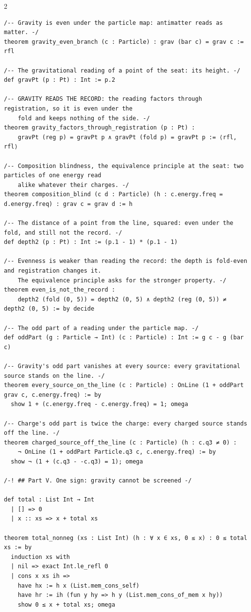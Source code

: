 \documentclass[10pt]{article}
\begin{document}
\begin{multicols}{2}
\begin{Verbatim}[fontsize=\fontsize{5.9}{6.8}\selectfont,breaklines,breakanywhere,breaksymbolleft={}]
/-- Gravity is even under the particle map: antimatter reads as matter. -/
theorem gravity_even_branch (c : Particle) : grav (bar c) = grav c := rfl

/-- The gravitational reading of a point of the seat: its height. -/
def gravPt (p : Pt) : Int := p.2

/-- GRAVITY READS THE RECORD: the reading factors through registration, so it is even under the
    fold and keeps nothing of the side. -/
theorem gravity_factors_through_registration (p : Pt) :
    gravPt (reg p) = gravPt p ∧ gravPt (fold p) = gravPt p := ⟨rfl, rfl⟩

/-- Composition blindness, the equivalence principle at the seat: two particles of one energy read
    alike whatever their charges. -/
theorem composition_blind (c d : Particle) (h : c.energy.freq = d.energy.freq) : grav c = grav d := h

/-- The distance of a point from the line, squared: even under the fold, and still not the record. -/
def depth2 (p : Pt) : Int := (p.1 - 1) * (p.1 - 1)

/-- Evenness is weaker than reading the record: the depth is fold-even and registration changes it.
    The equivalence principle asks for the stronger property. -/
theorem even_is_not_the_record :
    depth2 (fold (0, 5)) = depth2 (0, 5) ∧ depth2 (reg (0, 5)) ≠ depth2 (0, 5) := by decide

/-- The odd part of a reading under the particle map. -/
def oddPart (g : Particle → Int) (c : Particle) : Int := g c - g (bar c)

/-- Gravity's odd part vanishes at every source: every gravitational source stands on the line. -/
theorem every_source_on_the_line (c : Particle) : OnLine (1 + oddPart grav c, c.energy.freq) := by
  show 1 + (c.energy.freq - c.energy.freq) = 1; omega

/-- Charge's odd part is twice the charge: every charged source stands off the line. -/
theorem charged_source_off_the_line (c : Particle) (h : c.q3 ≠ 0) :
    ¬ OnLine (1 + oddPart Particle.q3 c, c.energy.freq) := by
  show ¬ (1 + (c.q3 - -c.q3) = 1); omega

/-! ## Part V. One sign: gravity cannot be screened -/

def total : List Int → Int
  | [] => 0
  | x :: xs => x + total xs

theorem total_nonneg (xs : List Int) (h : ∀ x ∈ xs, 0 ≤ x) : 0 ≤ total xs := by
  induction xs with
  | nil => exact Int.le_refl 0
  | cons x xs ih =>
    have hx := h x (List.mem_cons_self)
    have hr := ih (fun y hy => h y (List.mem_cons_of_mem x hy))
    show 0 ≤ x + total xs; omega


\end{Verbatim}
\end{multicols}
\end{document}
